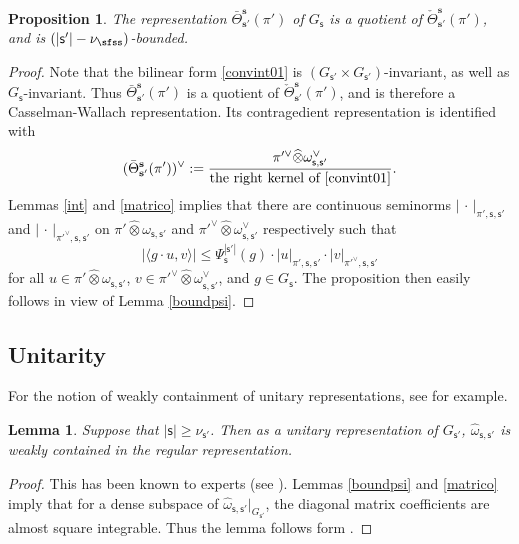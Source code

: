 \documentclass[11pt,a4paper]{amsart}
\def\abs#1{\left|{#1}\right|}
\newcommand{\la}{\langle}
\newcommand{\ra}{\rangle}
\numberwithin{equation}{section}
\newtheorem{lem}[thm]{Lemma}
\newtheorem{prop}[thm]{Proposition}
\theoremstyle{remark}
\def\Thetab{\bar{\Theta}}
\begin{document}
\begin{prop}\label{boundm}
The representation $\Thetab_{\mathbf s'}^{\mathbf s}(\pi')$ of $G_{\mathsf s}$ is a quotient of  $\check \Theta_{\mathbf s'}^{\mathbf s}(\pi')$, and is  $(\abs{\mathsf s'}-\nu_\sfss)$-bounded.
\end{prop}
\begin{proof}
Note that the bilinear form \eqref{convint01} is  $(G_{\mathsf s'}\times G_{\mathsf s'})$-invariant, as well as $G_{\mathsf s}$-invariant. Thus $\Thetab_{\mathbf s'}^{\mathbf s}(\pi')$ is a quotient of  $\check \Theta_{\mathbf s'}^{\mathbf s}(\pi')$, and is therefore a Casselman-Wallach representation. Its contragedient representation
is identified with
\[
(\Thetab_{\mathbf s'}^{\mathbf s}(\pi'))^\vee:=\frac{\pi'^\vee \widehat \otimes \omega^\vee_{\mathsf s, \mathsf s'}}{\textrm{the right kernel of \eqref{convint01}}}.
\]
 Lemmas \ref{int} and \ref{matrico} implies that there are continuous seminorms $\abs{\,\cdot\,}_{\pi', \mathsf s, \mathsf s'}$ and $\abs{\,\cdot\,}_{\pi'^\vee, \mathsf s, \mathsf s'}$ on  $\pi' \widehat \otimes \omega_{\mathsf s, \mathsf s'}$ and $\pi'^\vee \widehat \otimes \omega^\vee_{\mathsf s, \mathsf s'}$ respectively such that
\[
 \abs{ \la g\cdot u, v\ra}\leq \Psi_{\mathsf s}^{\abs{\mathsf s'}}(g)\cdot \abs{u}_{\pi', \mathsf s, \mathsf s'}\cdot \abs{v}_{\pi'^\vee, \mathsf s, \mathsf s'}
\]
for all $u\in \pi' \widehat \otimes \omega_{\mathsf s, \mathsf s'}$, $v\in \pi'^\vee \widehat \otimes \omega^\vee_{\mathsf s, \mathsf s'}$, and $g\in G_{\mathsf s}$.
The proposition  then easily follows in view of  Lemma \ref{boundpsi}.
 \end{proof}


\subsection{Unitarity}\label{unitarity}

For the notion of weakly containment of unitary representations, see \cite{CHH} for example.

\begin{lem}\label{weaklycont}
Suppose that $\abs{\mathsf s}\geq  \nu_{\mathsf s'}$. Then as a unitary representation of $G_{\mathsf s'}$, $\hat \omega_{\mathsf s, \mathsf s'}$ is weakly  contained
in the regular representation.
\end{lem}
\begin{proof}
This has been known to experts (see   \cite[Theorem 3.2]{Li89}).  Lemmas \ref{boundpsi} and \ref{matrico} imply that for a dense subspace of $\hat \omega_{\mathsf s, \mathsf s'}|_{G_{\mathsf s'}}$, the diagonal  matrix coefficients are almost square integrable.
 Thus the lemma follows form \cite[Theorem 1]{CHH}.
\end{proof}
\end{document}
